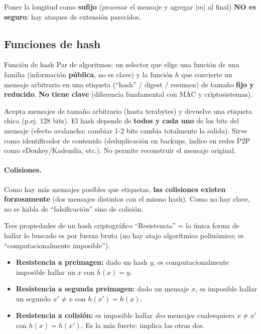 \documentclass[../main.tex]{subfiles}
\begin{document}
\begin{ojo}
Poner la longitud como \textbf{sufijo} (procesar el mensaje y agregar $|m|$ al final)
\textbf{NO es seguro}: hay ataques de extensión parecidos.
\end{ojo}

\subsection{Funciones de hash}

\begin{definicion}{Función de hash}
Par de algoritmos: un selector que elige una función de una familia (información
\textbf{pública}, no es clave) y la función $h$ que convierte un mensaje arbitrario en
una etiqueta (``hash'' / digest / resumen) de tamaño \textbf{fijo y reducido}.
\textbf{No tiene clave} (diferencia fundamental con MAC y criptosistemas).
\end{definicion}

Acepta mensajes de tamaño arbitrario (hasta terabytes) y devuelve una etiqueta chica
(p.ej. 128 bits). El hash depende de \textbf{todos y cada uno} de los bits del mensaje
(efecto avalancha: cambiar 1-2 bits cambia totalmente la salida). Sirve como
identificador de contenido (deduplicación en backups, índice en redes P2P como
eDonkey/Kademlia, etc.). No permite reconstruir el mensaje original.

\paragraph{Colisiones.} Como hay más mensajes posibles que etiquetas, \textbf{las
colisiones existen forzosamente} (dos mensajes distintos con el mismo hash). Como no
hay clave, no se habla de ``falsificación'' sino de colisión.

\begin{definicion}{Tres propiedades de un hash criptográfico}
``Resistencia'' = la única forma de hallar lo buscado es por fuerza bruta (no hay
atajo algorítmico polinómico; es ``computacionalmente imposible'').
\begin{itemize}[leftmargin=1.4em,nosep]
  \item \textbf{Resistencia a preimagen:} dado un hash $y$, es computacionalmente
  imposible hallar un $x$ con $h(x)=y$.
  \item \textbf{Resistencia a segunda preimagen:} dado un mensaje $x$, es imposible
  hallar un segundo $x' \neq x$ con $h(x')=h(x)$.
  \item \textbf{Resistencia a colisión:} es imposible hallar \emph{dos} mensajes
  cualesquiera $x \neq x'$ con $h(x)=h(x')$. Es la más fuerte: implica las otras dos.
\end{itemize}
\end{definicion}
\end{document}
